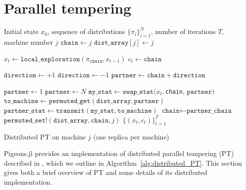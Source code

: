 \section{Parallel tempering}
\label{sec:PT}

\begin{algorithm}[t]
	\begin{algorithmic}[1]
    \Require Initial state $x_0$, sequence of distributions $\{\pi_i\}_{i=1}^N$, 
      number of iterations $T$, machine number $j$
    \State $\texttt{chain} \gets j$ 
    \State $\texttt{dist\_array}[j] \gets j$ 
		
    
     \State $x_t \gets \texttt{local\_exploration}(\pi_\texttt{chain}, x_{t-1})$
    \State $c_t \gets \texttt{chain}$ 
    
		    \State $\texttt{direction} \gets +1$
		  \Else
		    \State $\texttt{direction} \gets -1$
		  \EndIf
		  \State $\texttt{partner} \gets \texttt{chain} + \texttt{direction}$

     
        \State $\texttt{partner} \gets 1$ 
        \State $\texttt{partner} \gets N$
      \EndIf
	    \State $\texttt{my\_stat} \gets \texttt{swap\_stat}(x_t, $\texttt{chain}, $\texttt{partner} )$  
      \State $\texttt{to\_machine} \gets  \texttt{permuted\_get}(\texttt{dist\_array}, \texttt{partner})$
      \State $\texttt{partner\_stat} \gets \texttt{transmit}(\texttt{my\_stat}, \texttt{to\_machine})$
        \State $\texttt{chain} \gets \texttt{partner\_chain}$
      \EndIf
      \State $\texttt{permuted\_set!}(\texttt{dist\_array}, \texttt{chain}, j)$ 
		\EndFor
    \State \Return $\{(x_t, c_t)\}_{t=1}^T$
	\end{algorithmic}
  \caption{Distributed PT on machine $j$ (one replica per machine)}
  \label{alg:distributed_PT}
\end{algorithm}


Pigeons.jl provides an implementation of distributed parallel tempering (PT) described 
in \cite{syed2021nrpt}, which we outline in Algorithm~\ref{alg:distributed_PT}.
This section gives both a brief overview of PT and some details of 
its distributed implementation.

